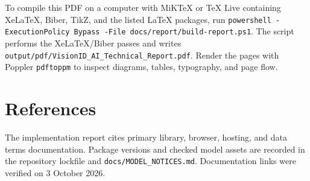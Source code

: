 \documentclass[11pt,oneside,openany]{report}
\newcommand{\code}[1]{\texttt{#1}}
\begin{document}
To compile this PDF on a computer with MiKTeX or TeX Live containing XeLaTeX, Biber, TikZ, and the listed LaTeX packages, run \code{powershell -ExecutionPolicy Bypass -File docs/report/build-report.ps1}. The script performs the XeLaTeX/Biber passes and writes \code{output/pdf/VisionID\_AI\_Technical\_Report.pdf}. Render the pages with Poppler \code{pdftoppm} to inspect diagrams, tables, typography, and page flow.

\chapter{References}
The implementation report cites primary library, browser, hosting, and data terms documentation. Package versions and checked model assets are recorded in the repository lockfile and \code{docs/MODEL\_NOTICES.md}. Documentation links were verified on 3 October 2026.
\printbibliography[heading=none]
\end{document}
